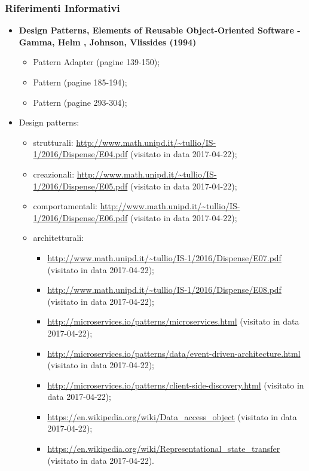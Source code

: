 	 \subsubsection{Riferimenti Informativi}
	  \begin{itemize}
		\item \textbf{Design Patterns, Elements of Reusable Object-Oriented Software - Gamma, Helm , Johnson, Vlissides (1994)}
		 \begin{itemize}
		  \item Pattern Adapter (pagine 139-150);
			\item Pattern  (pagine 185-194);
			\item Pattern  (pagine 293-304);
  	 \end{itemize}
	    \item Design patterns:
	      \begin{itemize}
	       \item strutturali:
	       \url{http://www.math.unipd.it/~tullio/IS-1/2016/Dispense/E04.pdf} (visitato in data 2017-04-22);
	       \item creazionali:
	       \url{http://www.math.unipd.it/~tullio/IS-1/2016/Dispense/E05.pdf} (visitato in data 2017-04-22);
	       \item comportamentali:
	       \url{http://www.math.unipd.it/~tullio/IS-1/2016/Dispense/E06.pdf} (visitato in data 2017-04-22);
	       \item architetturali:
	       \begin{itemize}
				 \item \url{http://www.math.unipd.it/~tullio/IS-1/2016/Dispense/E07.pdf} (visitato in data 2017-04-22);
	       \item \url{http://www.math.unipd.it/~tullio/IS-1/2016/Dispense/E08.pdf} (visitato in data 2017-04-22);
	       \item \url{http://microservices.io/patterns/microservices.html} (visitato in data 2017-04-22);
	       \item \url{http://microservices.io/patterns/data/event-driven-architecture.html} (visitato in data 2017-04-22);
	       \item \url{http://microservices.io/patterns/client-side-discovery.html} (visitato in data 2017-04-22);
	       \item \url{https://en.wikipedia.org/wiki/Data_access_object} (visitato in data 2017-04-22);
	       \item \url{https://en.wikipedia.org/wiki/Representational_state_transfer} (visitato in data 2017-04-22).

\end{itemize}
\end{itemize}
\end{itemize}
